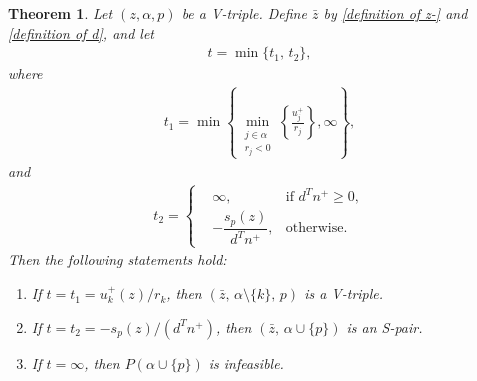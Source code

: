 \documentclass{article}
\newtheorem{theorem}{Theorem}
\begin{document}
	\begin{theorem}\label{V-tri z}
		Let $(z, \alpha, p)$ be a V-triple. Define $\bar{z}$ by \eqref{definition of z-} and \eqref{definition of d}, and let
		\begin{align}\label{definition of t}
			t = \min\{t_{1},\, t_{2}\},
		\end{align}
		where
		\begin{align}\label{definition of t1}
			t_{1} = \min\left\lbrace\min_{\substack{j \in \alpha\\ r_{j} < 0}} \left\lbrace\frac{u_{j}^{+}}{r_{j}}\right\rbrace, \infty \right\rbrace,
		\end{align}
		and
		\begin{align}\label{definition of t2}
			t_{2} =
			\left\lbrace\begin{aligned}
				&\infty, & \text{if } d^{T} n^{+} \geq 0,\\
				&-\dfrac{s_{p}(z)}{d^{T}n^{+}}, & \text{otherwise.}
			\end{aligned}\right.
		\end{align}
		Then the following statements hold:
		\begin{enumerate}
			\item If $t = t_{1} = u_{k}^{+}(z) / r_{k}$, then $(\bar{z},\, \alpha \setminus \{k\},\, p)$ is a V-triple.
			\item If $t = t_{2} = -s_{p}(z)/(d^{T}n^{+})$, then $(\bar{z},\, \alpha \cup \{p\})$ is an S-pair.
			\item If $t = \infty$, then $P(\alpha \cup \{p\})$ is infeasible.
		\end{enumerate}
	\end{theorem}
	
\end{document}
